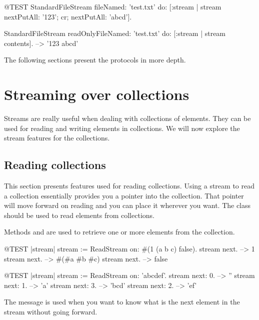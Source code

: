 \documentclass[a4paper,10pt,twoside]{book}
\begin{document}
\begin{code}{@TEST}
StandardFileStream
  fileNamed: 'test.txt'
  do: [:stream | stream
    nextPutAll: '123';
    cr;
    nextPutAll: 'abcd'].

StandardFileStream
  readOnlyFileNamed: 'test.txt'
  do: [:stream | stream contents]. --> '123
abcd'
\end{code}

The following sections present the protocols in more depth.

\section{Streaming over collections}

Streams are really useful when dealing with collections of elements.
They can be used for reading and writing elements in collections.
We will now explore the stream features for the collections.

\subsection{Reading collections}

This section presents features used for reading collections.
Using a stream to read a collection essentially provides you a pointer into the collection.
That pointer will move forward on reading and you can place it wherever you want.
The class  should be used to read elements from collections.

Methods  and  are used to retrieve one or more elements from the collection.

\begin{code}{@TEST |stream|}
stream := ReadStream on: #(1 (a b c) false).
stream next. -->   1
stream next. -->   #(#a #b #c)
stream next. -->   false
\end{code}

\begin{code}{@TEST |stream|}
stream := ReadStream on: 'abcdef'.
stream next: 0. -->   ''
stream next: 1. -->   'a'
stream next: 3. -->   'bcd'
stream next: 2. -->   'ef'
\end{code}

The message  is used when you want to know what is the next element in the stream without going forward.
\end{document}
